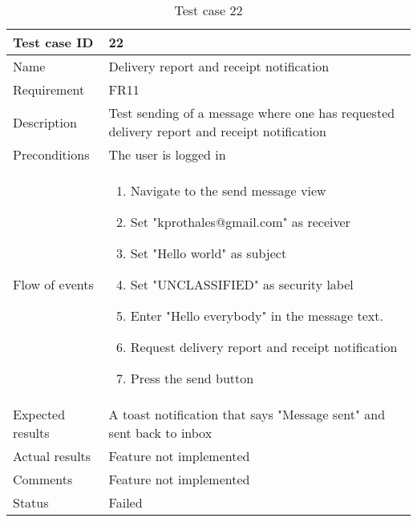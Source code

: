 		\begin{table}
			\begin{tabular}{l|p{10cm}}
				Test case ID & 22 \\ \hline
				Name & Delivery report and receipt notification\\ \hline
				Requirement & FR11\\ \hline
				Description & Test sending of a message where one has requested delivery report and receipt notification\\ \hline
				Preconditions & The user is logged in\\ \hline
				Flow of events & 
					\begin{enumerate}
						\item{}Navigate to the send message view
						\item{}Set "kprothales@gmail.com" as receiver
						\item{}Set "Hello world" as subject
						\item{}Set "UNCLASSIFIED" as security label
						\item{}Enter "Hello everybody" in the message text.
						\item{}Request delivery report and receipt notification
						\item{}Press the send button
					\end{enumerate} \\ \hline
				Expected results & A toast notification that says "Message sent" and sent back to inbox \\ \hline
				Actual results & Feature not implemented\\ \hline
				Comments &Feature not implemented\\ \hline
				Status &Failed \\ \hline
			\end{tabular}
			\caption{Test case 22} \label{tab:case22}
		\end{table}

